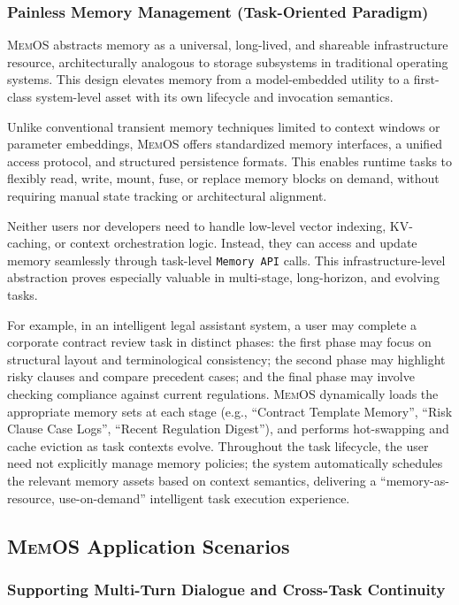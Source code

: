 \documentclass[]{memtensor}
\begin{document}
\subsubsection{Painless Memory Management (Task-Oriented Paradigm)}

\textsc{MemOS} abstracts memory as a universal, long-lived, and shareable infrastructure resource, architecturally analogous to storage subsystems in traditional operating systems.
This design elevates memory from a model-embedded utility to a first-class system-level asset with its own lifecycle and invocation semantics.

Unlike conventional transient memory techniques limited to context windows or parameter embeddings,
\textsc{MemOS} offers standardized memory interfaces, a unified access protocol, and structured persistence formats.
This enables runtime tasks to flexibly read, write, mount, fuse, or replace memory blocks on demand,
without requiring manual state tracking or architectural alignment.

Neither users nor developers need to handle low-level vector indexing, KV-caching, or context orchestration logic.
Instead, they can access and update memory seamlessly through task-level \texttt{Memory API} calls.
This infrastructure-level abstraction proves especially valuable in multi-stage, long-horizon, and evolving tasks.

For example, in an intelligent legal assistant system, a user may complete a corporate contract review task in distinct phases:
the first phase may focus on structural layout and terminological consistency;
the second phase may highlight risky clauses and compare precedent cases;
and the final phase may involve checking compliance against current regulations.
\textsc{MemOS} dynamically loads the appropriate memory sets at each stage (e.g., “Contract Template Memory”, “Risk Clause Case Logs”, “Recent Regulation Digest”),
and performs hot-swapping and cache eviction as task contexts evolve.
Throughout the task lifecycle, the user need not explicitly manage memory policies;
the system automatically schedules the relevant memory assets based on context semantics,
delivering a “memory-as-resource, use-on-demand” intelligent task execution experience.

\subsection{\textsc{MemOS} Application Scenarios}

\subsubsection{Supporting Multi-Turn Dialogue and Cross-Task Continuity}
\end{document}
